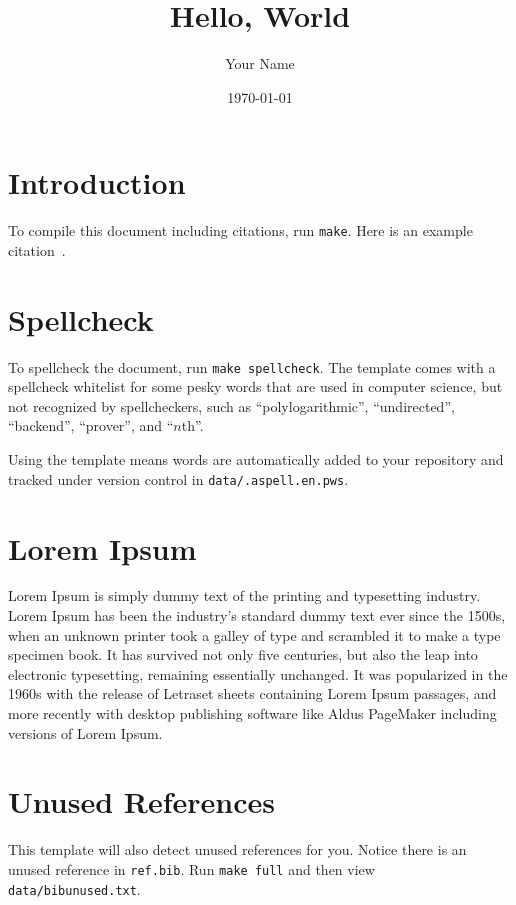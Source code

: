 \documentclass{article}
\title{Hello, World}
\author{Your Name}
\date{\today{}}
\begin{document}
\maketitle

\section{Introduction}

To compile this document including citations, run \texttt{make}.
Here is an example citation~\cite{knuth1997art}.

\section{Spellcheck}

To spellcheck the document, run \texttt{make spellcheck}.
The template comes with a spellcheck whitelist for some pesky words that
are used in computer science, but not recognized by spellcheckers, such as
``polylogarithmic'', ``undirected'', ``backend'', ``prover'', and ``$n$th''.

Using the template means words are automatically added to your repository and
tracked under version control in \texttt{data/.aspell.en.pws}.

\section{Lorem Ipsum}

Lorem Ipsum is simply dummy text of the printing and typesetting industry. Lorem Ipsum has been the industry's standard dummy text ever since the 1500s, when an unknown printer took a galley of type and scrambled it to make a type specimen book. It has survived not only five centuries, but also the leap into electronic typesetting, remaining essentially unchanged. It was popularized in the 1960s with the release of Letraset sheets containing Lorem Ipsum passages, and more recently with desktop publishing software like Aldus PageMaker including versions of Lorem Ipsum.

\section{Unused References}

This template will also detect unused references for you.
Notice there is an unused reference in \texttt{ref.bib}.
Run \texttt{make full} and then view \texttt{data/bibunused.txt}.
\end{document}
